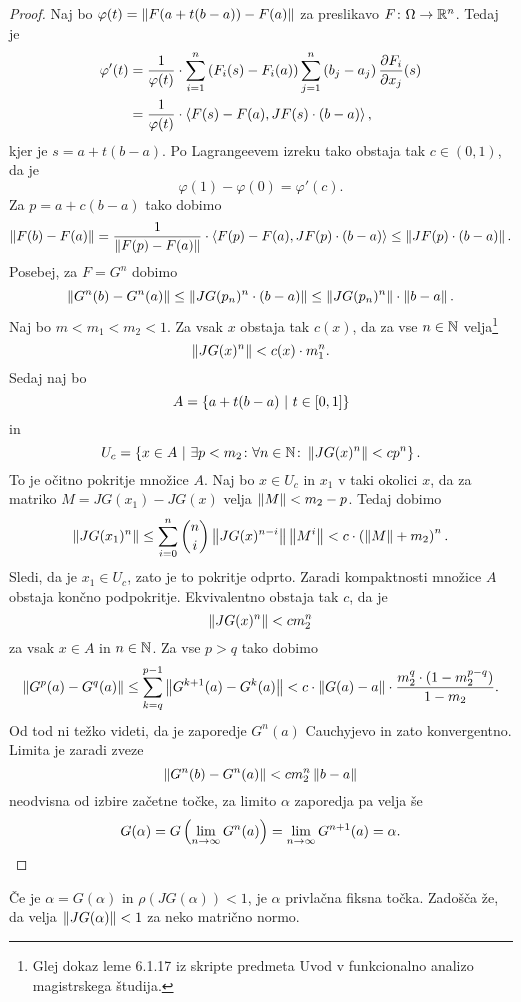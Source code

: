 \begin{proof}
Naj bo $\varphi(t) = \left\lVert F(a + t(b-a)) - F(a)\right\rVert$ za preslikavo
$F \colon \Omega \to \mathbb{R}^n$. Tedaj je
\begin{align*}
\varphi'(t)
&=
\frac{1}{\varphi(t)} \cdot
\sum_{i=1}^n \left(F_i(s) - F_i(a)\right)
\sum_{j=1}^n \left(b_j - a_j\right) \frac{\partial F_i}{\partial x_j}(s)
\\
&=
\frac{1}{\varphi(t)} \cdot \left\langle F(s) - F(a), JF(s) \cdot (b-a)\right\rangle,
\end{align*}
kjer je $s = a + t(b-a)$. Po Lagrangeevem izreku tako obstaja tak
$c \in (0, 1)$, da je
\[
\varphi(1) - \varphi(0) = \varphi'(c).
\]
Za $p = a + c(b-a)$ tako dobimo
\[
\left\lVert F(b) - F(a)\right\rVert =
\frac{1}{\left\lVert F(p) - F(a)\right\rVert} \cdot
\left\langle F(p) - F(a), JF(p) \cdot (b-a)\right\rangle \leq
\left\lVert JF(p) \cdot (b-a)\right\rVert.
\]
Posebej, za $F = G^n$ dobimo
\[
\left\lVert G^n(b) - G^n(a)\right\rVert \leq
\left\lVert JG(p_n)^n \cdot (b-a)\right\rVert \leq
\left\lVert JG(p_n)^n\right\rVert \cdot \left\lVert b-a\right\rVert.
\]
Naj bo $m < m_1 < m_2 < 1$. Za vsak $x$ obstaja tak $c(x)$, da za
vse $n \in \mathbb{N}$ velja\footnote{Glej dokaz leme 6.1.17 iz skripte
predmeta Uvod v funkcionalno analizo magistrskega študija.}
\[
\left\lVert JG(x)^n\right\rVert < c(x) \cdot m_1^n.
\]
Sedaj naj bo
\[
A = \left\{a + t (b-a)~\middle\vert~t \in [0,1]\right\}
\]
in
\[
U_c = \left\{x \in A~\middle\vert~\exists p < m_2 \colon \forall n \in \mathbb{N} \colon
\left\lVert JG(x)^n\right\rVert < cp^n\right\}.
\]
To je očitno pokritje množice $A$. Naj bo $x \in U_c$ in
$x_1$ v taki okolici $x$, da za matriko $M = JG(x_1) - JG(x)$ velja
$\left\lVert M\right\rVert < m_2 - p$. Tedaj dobimo
\[
\left\lVert JG(x_1)^n\right\rVert \leq
\sum_{i=0}^n \binom{n}{i} \left\lVert JG(x)^{n-i}\right\rVert \left\lVert M^i\right\rVert <
c \cdot \left(\left\lVert M\right\rVert + m_2\right)^n.
\]
Sledi, da je $x_1 \in U_c$, zato je to pokritje odprto. Zaradi
kompaktnosti množice $A$ obstaja končno podpokritje. Ekvivalentno
obstaja tak $c$, da je
\[
\left\lVert JG(x)^n\right\rVert < c m_2^n
\]
za vsak $x \in A$ in $n \in \mathbb{N}$. Za vse $p > q$ tako dobimo
\[
\left\lVert G^p(a) - G^q(a)\right\rVert \leq
\sum_{k=q}^{p-1} \left\lVert G^{k+1}(a) - G^k(a)\right\rVert <
c \cdot \left\lVert G(a) - a\right\rVert \cdot
\frac{m_2^q \cdot (1 - m_2^{p-q})}{1-m_2}.
\]
Od tod ni težko videti, da je zaporedje $G^n(a)$ Cauchyjevo in zato
konvergentno. Limita je zaradi zveze
\[
\left\lVert G^n(b) - G^n(a)\right\rVert < c m_2^n \left\lVert b - a\right\rVert
\]
neodvisna od izbire začetne točke, za limito $\alpha$ zaporedja pa
velja še
\[
G(\alpha) = G \left(\lim_{n \to \infty} G^n(a)\right) =
\lim_{n \to \infty} G^{n+1}(a) = \alpha. \qedhere
\]
\end{proof}

\begin{opomba}
Če je $\alpha = G(\alpha)$ in $\rho(JG(\alpha)) < 1$, je $\alpha$
privlačna fiksna točka. Zadošča že, da velja
$\left\lVert JG(\alpha)\right\rVert < 1$ za neko matrično normo.
\end{opomba}

